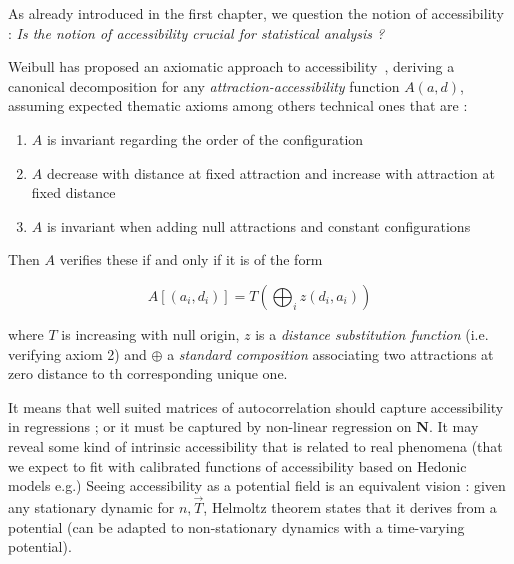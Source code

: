 

As already introduced in the first chapter, we question the notion of accessibility : \textit{Is the notion of accessibility crucial for statistical analysis ?}

\medskip


Weibull has proposed an axiomatic approach to accessibility~\cite{weibull1976axiomatic}, deriving a canonical decomposition for any \emph{attraction-accessibility} function $A(a,d)$, assuming expected thematic axioms among others technical ones that are :
\begin{enumerate}
\item $A$ is invariant regarding the order of the configuration
\item $A$ decrease with distance at fixed attraction and increase with attraction at fixed distance
\item $A$ is invariant when adding null attractions and constant configurations
\end{enumerate}
Then $A$ verifies these if and only if it is of the form

\[
A\left[(a_i,d_i)\right] = T\left(\bigoplus_i z(d_i,a_i)\right)
\]

where $T$ is increasing with null origin, $z$ is a \emph{distance substitution function} (i.e. verifying axiom 2) and $\oplus$ a \emph{standard composition} associating two attractions at zero distance to th corresponding unique one. 

It means that well suited matrices of autocorrelation should capture accessibility in regressions ; 
 or it must be captured by non-linear regression on $\mathbf{N}$. It may reveal some kind of intrinsic accessibility that is related to real phenomena (that we expect to fit with calibrated functions of accessibility based on Hedonic models e.g.) Seeing accessibility as a potential field is an equivalent vision : given any stationary dynamic for $n,\vec{T}$, Helmoltz theorem states that it derives from a potential (can be adapted to non-stationary dynamics with a time-varying potential).




